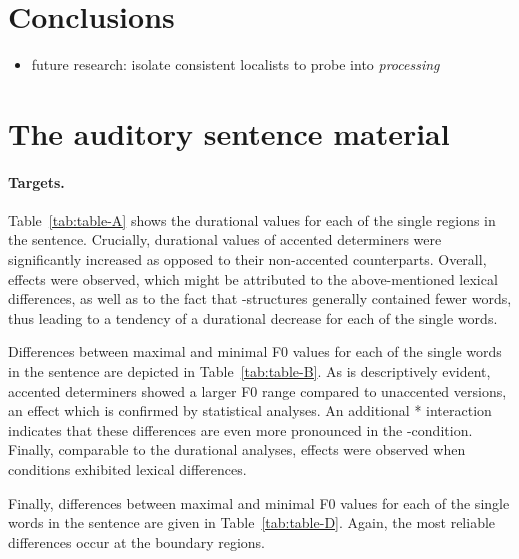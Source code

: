 \documentclass[fleqn,reqno,10pt,draft]{article}
\newcommand{\as}{\acro{as}}
\renewcommand{\es}{\acro{es}}
\begin{document}
\section{Conclusions}
\label{sec:conclusions}

\begin{itemize}
\item future research: isolate consistent localists to probe into \emph{processing}
\end{itemize}

\appendix

\section{The auditory sentence material}
\label{sec:audit-sent-mater}


\paragraph{Targets.} Table~\ref{tab:table-A} shows the durational values for each of
the single regions in the sentence. Crucially, durational values of
accented determiners were significantly increased as opposed to their
non-accented counterparts. Overall,  effects were
observed, which might be attributed to the above-mentioned lexical
differences, as well as to the fact that \es-structures generally
contained fewer words, thus leading to a tendency of a durational
decrease for each of the single words.

Differences between maximal and minimal F0 values for each of the
single words in the sentence are depicted in
Table~\ref{tab:table-B}. As is descriptively evident, accented
determiners showed a larger F0 range compared to unaccented versions,
an effect which is confirmed by statistical analyses. An additional
* interaction indicates that these
differences are even more pronounced in the \as-condition. Finally,
comparable to the durational analyses,  effects were
observed when conditions exhibited lexical differences.

Finally, differences between maximal and minimal F0 values for each of
the single words in the sentence are given in
Table~\ref{tab:table-D}. Again, the most reliable differences occur at
the boundary regions.
\end{document}
